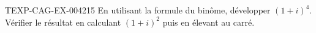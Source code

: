 \begin{exercice}{TEXP-CAG-EX-004}{2}{15}
En utilisant la formule du binôme, développer $(1+i)^4$. Vérifier le résultat en calculant $(1+i)^2$ puis en élevant au carré.
\end{exercice}
